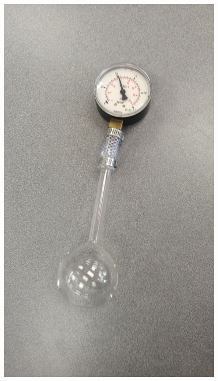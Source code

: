 \documentclass[a4paper,12pt]{article}
\begin{document}
\begin{figure}[H]
    \centering
    \begin{minipage}{.4\textwidth}
        \centering
        \includegraphics[scale=0.07]{assets/probe.jpg}
        \label{fig:probe}
    \end{minipage}%
    \begin{minipage}{.6\textwidth}
        \centering

\end{minipage}
\end{figure}
\end{document}
